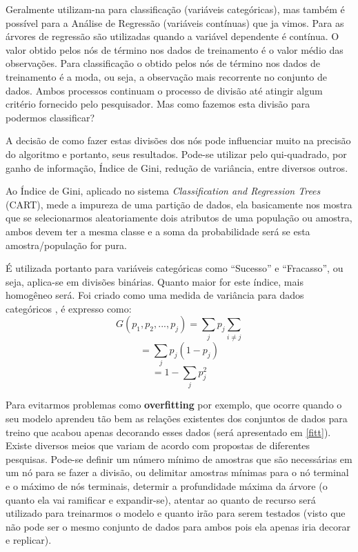 \documentclass[
  openany]{book}
\begin{document}
Geralmente utilizam-na para classificação (variáveis categóricas), mas também é possível para a Análise de Regressão (variáveis contínuas) que ja vimos. Para as árvores de regressão são utilizadas quando a variável dependente é contínua. O valor obtido pelos nós de término nos dados de treinamento é o valor médio das observações. Para classificação o obtido pelos nós de término nos dados de treinamento é a moda, ou seja, a observação mais recorrente no conjunto de dados. Ambos processos continuam o processo de divisão até atingir algum critério fornecido pelo pesquisador. Mas como fazemos esta divisão para podermos classificar?

A decisão de como fazer estas divisões dos nós pode influenciar muito na precisão do algoritmo e portanto, seus resultados. Pode-se utilizar pelo qui-quadrado, por ganho de informação, Índice de Gini, redução de variância, entre diversos outros.

Ao Índice de Gini, aplicado no sistema \emph{Classification and Regression Trees} (CART)\citep{breiman1984classification}, mede a impureza de uma partição de dados, ela basicamente nos mostra que se selecionarmos aleatoriamente dois atributos de uma população ou amostra, ambos devem ter a mesma classe e a soma da probabilidade será se esta amostra/população for pura.

É utilizada portanto para variáveis categóricas como ``Sucesso'' e ``Fracasso'', ou seja, aplica-se em divisões binárias. Quanto maior for este índice, mais homogêneo será. Foi criado como uma medida de variância para dados categóricos \citep{light1971analysis}, é expresso como:
\[G(p_1,p_2,...,p_j)=\displaystyle \sum_{j}p_j  \sum_{i\neq j}\]
\[= \displaystyle \sum_j p_j(1-p_j) \]
\begin{equation}
= \displaystyle 1-\sum_j p^2_j
\label{eq:indgini1}
\end{equation}

Para evitarmos problemas como \textbf{overfitting} por exemplo, que ocorre quando o seu modelo aprendeu tão bem as relações existentes dos conjuntos de dados para treino que acabou apenas decorando esses dados (será apresentado em \ref{fitt}). Existe diversos meios que variam de acordo com propostas de diferentes pesquisas. Pode-se definir um número mínimo de amostras que são necessárias em um nó para se fazer a divisão, ou delimitar amostras mínimas para o nó terminal e o máximo de nós terminais, determir a profundidade máxima da árvore (o quanto ela vai ramificar e expandir-se), atentar ao quanto de recurso será utilizado para treinarmos o modelo e quanto irão para serem testados (visto que não pode ser o mesmo conjunto de dados para ambos pois ela apenas iria decorar e replicar).
\end{document}
